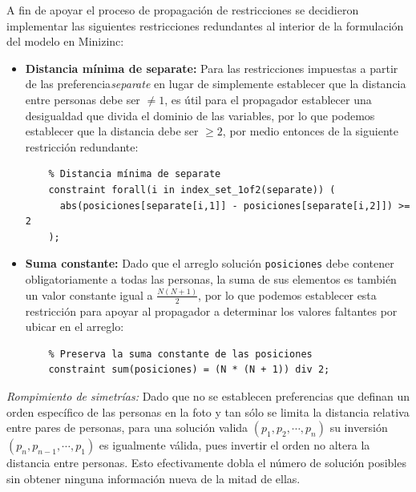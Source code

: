 A fin de apoyar el proceso de propagación de restricciones se decidieron implementar las siguientes restricciones redundantes al interior de la formulación del modelo en Minizinc:
\begin{itemize}
    \item \textbf{Distancia mínima de separate:} Para las restricciones impuestas a partir de las preferencia\textit{separate} en lugar de simplemente establecer que la distancia entre personas debe ser $\neq1$, es útil para el propagador establecer una desigualdad que divida el dominio de las variables, por lo que podemos establecer que la distancia debe ser $\geq 2$, por medio entonces de la siguiente restricción redundante:
    \begin{verbatim}
    % Distancia mínima de separate
    constraint forall(i in index_set_1of2(separate)) (
      abs(posiciones[separate[i,1]] - posiciones[separate[i,2]]) >= 2
    );
    \end{verbatim}

    \item \textbf{Suma constante:} Dado que el arreglo solución \verb|posiciones| debe contener obligatoriamente a todas las personas, la suma de sus elementos es también un valor constante igual a $\frac{N(N+1)}{2}$, por lo que podemos establecer esta restricción para apoyar al propagador a determinar los valores faltantes por ubicar en el arreglo:
    \begin{verbatim}
    % Preserva la suma constante de las posiciones
    constraint sum(posiciones) = (N * (N + 1)) div 2;
    \end{verbatim}
    
    
\end{itemize}

\textit{Rompimiento de simetrías:}
Dado que no se establecen preferencias que definan un orden específico de las personas en la foto y tan sólo se limita la distancia relativa entre pares de personas, para una solución valida $(p_1,p_2,\cdots, p_n)$ su inversión  $(p_n,p_{n-1},\cdots, p_1)$ es igualmente válida, pues invertir el orden no altera la distancia entre personas. Esto efectivamente dobla el número de solución posibles sin obtener ninguna información nueva de la mitad de ellas.\\

